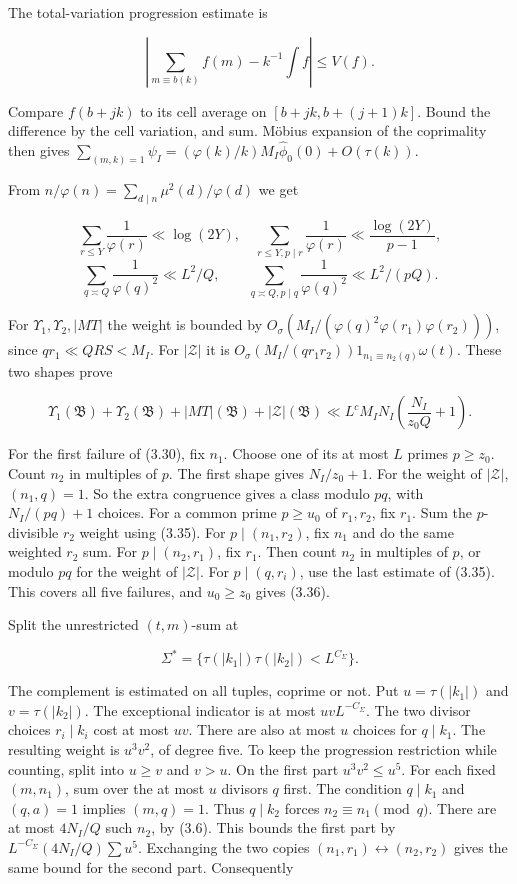 The total-variation progression estimate is

\[
\left|\sum_{m\equiv b(k)}f(m)-k^{-1}\int f\right|\le V(f).
\tag{3.34}
\]

Compare $f(b+jk)$ to its cell average on
$[b+jk,b+(j+1)k]$. Bound the difference by the cell variation,
and sum. Möbius expansion of the coprimality then gives
$\sum_{(m,k)=1}\psi_I=(\varphi(k)/k)M_I\widehat\phi_0(0)
+O(\tau(k))$.

From $n/\varphi(n)=\sum_{d\mid n}\mu^2(d)/\varphi(d)$ we get

\[
\sum_{r\le Y}\frac1{\varphi(r)}\ll\log(2Y),\quad
\sum_{r\le Y,p\mid r}\frac1{\varphi(r)}\ll\frac{\log(2Y)}{p-1},
\]
\[
\sum_{q\asymp Q}\frac1{\varphi(q)^2}\ll L^2/Q,\qquad
\sum_{q\asymp Q,p\mid q}\frac1{\varphi(q)^2}\ll L^2/(pQ).
\tag{3.35}
\]

For $\Upsilon_1,\Upsilon_2,|MT|$ the weight is bounded by
$O_\sigma(M_I/(\varphi(q)^2\varphi(r_1)\varphi(r_2)))$, since
$qr_1\ll QRS<M_I$. For $|\mathcal Z|$ it is
$O_\sigma(M_I/(qr_1r_2))1_{n_1\equiv n_2(q)}\omega(t)$.
These two shapes prove

\[
\Upsilon_1(\mathfrak B)+\Upsilon_2(\mathfrak B)+|MT|(\mathfrak B)+|\mathcal Z|(\mathfrak B)
 \ll L^cM_IN_I\left(\frac{N_I}{z_0Q}+1\right).
\tag{3.36}
\]

For the first failure of (3.30), fix $n_1$.
Choose one of its at most $L$ primes $p\ge z_0$.
Count $n_2$ in multiples of $p$. The first shape gives $N_I/z_0+1$.
For the weight of $|\mathcal Z|$, $(n_1,q)=1$.
So the extra congruence gives a class modulo $pq$,
with $N_I/(pq)+1$ choices.
For a common prime $p\ge u_0$ of $r_1,r_2$, fix $r_1$.
Sum the $p$-divisible $r_2$ weight using (3.35).
For $p\mid(n_1,r_2)$, fix $n_1$ and do the same weighted $r_2$ sum.
For $p\mid(n_2,r_1)$, fix $r_1$.
Then count $n_2$ in multiples of $p$, or modulo $pq$ for the weight of $|\mathcal Z|$.
For $p\mid(q,r_i)$, use the last estimate of (3.35).
This covers all five failures, and $u_0\ge z_0$ gives (3.36).

Split the unrestricted $(t,m)$-sum at

\[
\Sigma^*=\{\tau(|k_1|)\tau(|k_2|)<L^{C_\Sigma}\}.
\tag{3.37}
\]

The complement is estimated on all tuples, coprime or not.
Put $u=\tau(|k_1|)$ and $v=\tau(|k_2|)$.
The exceptional indicator is at most $uvL^{-C_\Sigma}$.
The two divisor choices $r_i\mid k_i$ cost at most $uv$.
There are also at most $u$ choices for $q\mid k_1$.
The resulting weight is $u^3v^2$, of degree five.
To keep the progression restriction while counting, split into $u\ge v$
and $v>u$.
On the first part $u^3v^2\le u^5$.
For each fixed $(m,n_1)$, sum over the at most $u$ divisors $q$ first.
The condition $q\mid k_1$ and $(q,a)=1$ implies $(m,q)=1$.
Thus $q\mid k_2$ forces $n_2\equiv n_1\pmod q$.
There are at most $4N_I/Q$ such $n_2$, by (3.6).
This bounds the first part by $L^{-C_\Sigma}(4N_I/Q)\sum u^5$.
Exchanging the two copies $(n_1,r_1)\leftrightarrow(n_2,r_2)$ gives the same bound for the second part.
Consequently


